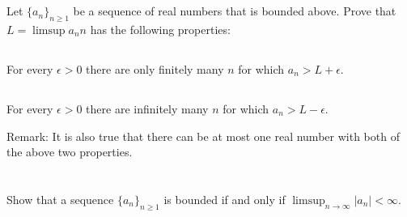 \documentclass[11pt,letterpaper]{article}
\begin{document}
\section{}
Let $\{a_n\}_{n\geq 1}$ be a sequence of real numbers that is bounded above.
Prove that $L = \limsup a_nn$ has the following properties:\

\subsection{} For every $\epsilon > 0$ there are only finitely many $n$ for which $a_n>L+\epsilon$.

\subsection{} For every $\epsilon > 0$ there are infinitely many $n$ for which $a_n>L-\epsilon$.

Remark: It is also true that there can be at most one real number with both of the above two properties.

\section{}
Show that a sequence $\{a_n\}_{n\geq 1}$ is bounded if and only if $\limsup_{n\to\infty} |a_n|<\infty$.





\vfill
\printbibliography
\end{document}
